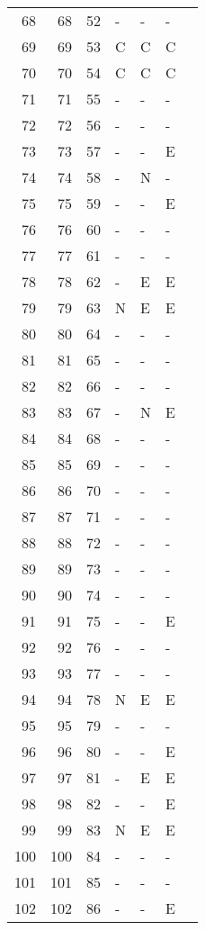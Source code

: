 \begin{longtable}{rrrllll}
  68 &  68 &  52 & - & - & - &  \\ 
  69 &  69 &  53 & C & C & C &  \\ 
  70 &  70 &  54 & C & C & C &  \\ 
  71 &  71 &  55 & - & - & - &  \\ 
  72 &  72 &  56 & - & - & - &  \\ 
  73 &  73 &  57 & - & - & E &  \\ 
  74 &  74 &  58 & - & N & - &  \\ 
  75 &  75 &  59 & - & - & E &  \\ 
  76 &  76 &  60 & - & - & - &  \\ 
  77 &  77 &  61 & - & - & - &  \\ 
  78 &  78 &  62 & - & E & E &  \\ 
  79 &  79 &  63 & N & E & E &  \\ 
  80 &  80 &  64 & - & - & - &  \\ 
  81 &  81 &  65 & - & - & - &  \\ 
  82 &  82 &  66 & - & - & - &  \\ 
  83 &  83 &  67 & - & N & E &  \\ 
  84 &  84 &  68 & - & - & - &  \\ 
  85 &  85 &  69 & - & - & - &  \\ 
  86 &  86 &  70 & - & - & - &  \\ 
  87 &  87 &  71 & - & - & - &  \\ 
  88 &  88 &  72 & - & - & - &  \\ 
  89 &  89 &  73 & - & - & - &  \\ 
  90 &  90 &  74 & - & - & - &  \\ 
  91 &  91 &  75 & - & - & E &  \\ 
  92 &  92 &  76 & - & - & - &  \\ 
  93 &  93 &  77 & - & - & - &  \\ 
  94 &  94 &  78 & N & E & E &  \\ 
  95 &  95 &  79 & - & - & - &  \\ 
  96 &  96 &  80 & - & - & E &  \\ 
  97 &  97 &  81 & - & E & E &  \\ 
  98 &  98 &  82 & - & - & E &  \\ 
  99 &  99 &  83 & N & E & E &  \\ 
  100 & 100 &  84 & - & - & - &  \\ 
  101 & 101 &  85 & - & - & - &  \\ 
  102 & 102 &  86 & - & - & E &  \\ 

\end{longtable}
